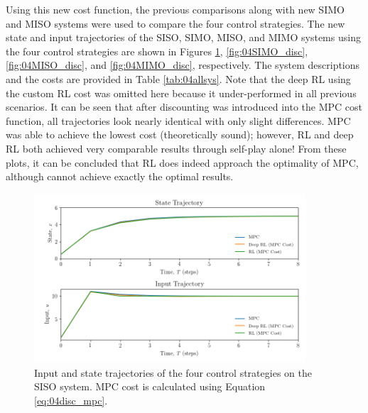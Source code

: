 Using this new cost function, the previous comparisons along with new SIMO and MISO systems were used to compare the four control strategies.  The new state and input trajectories of the SISO, SIMO, MISO, and MIMO systems using the four control strategies are shown in Figures \ref{fig:04SISO_disc}, \ref{fig:04SIMO_disc}, \ref{fig:04MISO_disc}, and \ref{fig:04MIMO_disc}, respectively.  The system descriptions and the costs are provided in Table \ref{tab:04allsys}.  Note that the deep RL using the custom RL cost was omitted here because it under-performed in all previous scenarios.  It can be seen that after discounting was introduced into the MPC cost function, all trajectories look nearly identical with only slight differences.  MPC was able to achieve the lowest cost (theoretically sound); however, RL and deep RL both achieved very comparable results through self-play alone!  From these plots, it can be concluded that RL does indeed approach the optimality of MPC, although cannot achieve exactly the optimal results.

\begin{figure}[H]
    \centering
    \includegraphics[width=0.9\textwidth]{images/ch4/State_and_Input.png}
    \caption{Input and state trajectories of the four control strategies on the SISO system.  MPC cost is calculated using Equation \ref{eq:04disc_mpc}.}
    \label{fig:04SISO_disc}
\end{figure}

